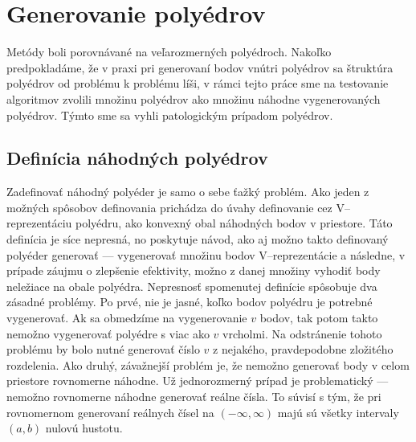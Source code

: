 \section{Generovanie polyédrov}
Metódy boli porovnávané na veľarozmerných polyédroch.
Nakoľko predpokladáme, že v praxi pri generovaní bodov vnútri polyédrov sa štruktúra polyédrov od problému k problému líši, v rámci tejto práce sme na testovanie algoritmov zvolili množinu polyédrov ako množinu náhodne vygenerovaných polyédrov.
Týmto sme sa vyhli patologickým prípadom polyédrov.

\subsection{Definícia náhodných polyédrov}
Zadefinovať náhodný polyéder je samo o sebe ťažký problém. Ako jeden z možných spôsobov definovania prichádza do úvahy definovanie cez V--reprezentáciu polyédru, ako konvexný obal náhodných bodov v priestore. Táto definícia je síce nepresná, no poskytuje návod, ako aj možno takto definovaný polyéder generovať --- vygenerovať množinu bodov V--reprezentácie a následne, v prípade záujmu o zlepšenie efektivity, možno z danej množiny vyhodiť body neležiace na obale polyédra. Nepresnosť spomenutej definície spôsobuje dva zásadné problémy.
Po prvé, nie je jasné, koľko bodov polyédru je potrebné vygenerovať. Ak sa obmedzíme na vygenerovanie $v$ bodov, tak potom takto nemožno vygenerovať polyédre s viac ako $v$ vrcholmi. Na odstránenie tohoto problému by bolo nutné generovať číslo $v$ z nejakého, pravdepodobne zložitého rozdelenia. 
Ako druhý, závažnejší problém je, že nemožno generovať body v celom priestore rovnomerne náhodne. Už jednorozmerný prípad je problematický --- nemožno rovnomerne náhodne generovať reálne čísla. To súvisí s tým, že pri rovnomernom generovaní reálnych čísel na $(-\infty, \infty)$ majú sú všetky intervaly $(a,b)$ nulovú hustotu.\\

